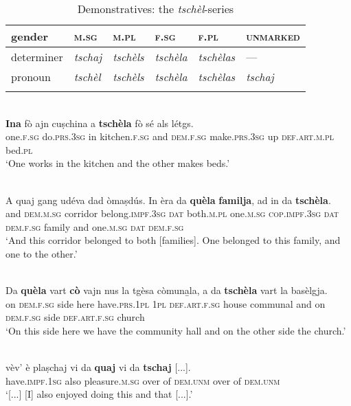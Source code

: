 \begin{table}
\caption{Demonstratives: the \textit{tschèl}-series}
\label{demtschel}
 \begin{tabular}{llllll}
  \lsptoprule
    gender        & \textsc{m.sg} & \textsc{m.pl} & \textsc{f.sg} & \textsc{f.pl} & \textsc{unmarked}\\
  \midrule
  determiner  & \textit{tschaj} &  \textit{tschèls}  & \textit{tschèla}  & \textit{tschèlas} & ---\\
  pronoun  & \textit{tschèl} & \textit{tschèls} & \textit{tschèla} & \textit{tschèlas} & \textit{tschaj}\\
  \lspbottomrule
 \end{tabular}
\end{table}

\ea
{}\\
\gll \textbf{Ina} fò ajn cuṣchina a \textbf{tschèla} fò sé als létgs.\\
  one.\textsc{f.sg} do.\textsc{prs.3sg} in kitchen.\textsc{f.sg} and \textsc{dem.f.sg} make.\textsc{prs.3sg} up \textsc{def.art.m.pl} bed.\textsc{pl}\\
\glt `One works in the kitchen and the other makes beds.'
\z

\ea
{}\\
\gll    A quaj gang udéva dad òmaṣdús.  In èra da \textbf{quèla} \textbf{familja}, ad in da \textbf{tschèla}.\\
and \textsc{dem.m.sg} corridor belong.\textsc{impf.3sg} \textsc{dat}  both.\textsc{m.pl} one.\textsc{m.sg} \textsc{cop.impf.3sg} \textsc{dat}  \textsc{dem.f.sg} family and one.\textsc{m.sg} \textsc{dat} \textsc{dem.f.sg}\\
\glt `And this corridor belonged to both [families]. One belonged to this family, and one to the other.'
\z

\ea
{}\\
\gll Da \textbf{quèla} vart \textbf{cò} vajn nus la tgèsa còmuna̱la, a da \textbf{tschèla} vart la basèlgja.\\
on \textsc{dem.f.sg} side here have.\textsc{prs.1pl} \textsc{1pl} \textsc{def.art.f.sg} house communal and on \textsc{dem.f.sg} side \textsc{def.art.f.sg} church\\
\glt`On this side here we have the community hall and on the other side the church.'
\z

\ea
{}\\
\gll [...] vèv' è plaṣchaj vi da \textbf{quaj} vi da \textbf{tschaj} [...].\\
{} have.\textsc{impf.1sg} also pleasure.\textsc{m.sg} over of \textsc{dem.unm} over of \textsc{dem.unm}\\
\glt `[...] [I] also enjoyed doing this and that [...].'
\z

